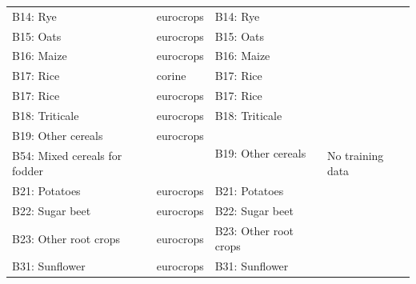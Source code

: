 \begin{table}[]
{\begin{tabular}{llll}
B14: Rye                                      & eurocrops               & B14: Rye                                              &                                                           \\
B15: Oats                                     & eurocrops               & B15: Oats                                             &                                                           \\
B16: Maize                                    & eurocrops               & B16: Maize                                            &                                                           \\
B17: Rice                                     & corine                  & B17: Rice                                             &                                                           \\
B17: Rice                                     & eurocrops               & B17: Rice                                             &                                                           \\
B18: Triticale                                & eurocrops               & B18: Triticale                                        &                                                           \\
B19: Other cereals                            & eurocrops               & \multirow{2}{*}{B19: Other cereals}                   &                                                           \\
B54: Mixed cereals for fodder                 &                         &                                                       & No training data                                          \\
B21: Potatoes                                 & eurocrops               & B21: Potatoes                                         &                                                           \\
B22: Sugar beet                               & eurocrops               & B22: Sugar beet                                       &                                                           \\
B23: Other root crops                         & eurocrops               & B23: Other root crops                                 &                                                           \\
B31: Sunflower                                & eurocrops               & B31: Sunflower                                        &                                                           \\

\end{tabular}}
\end{table}

